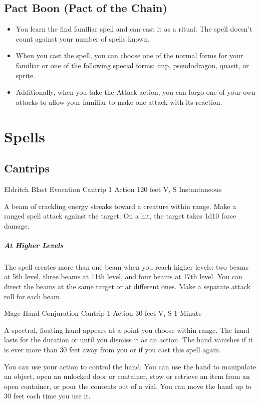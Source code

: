 {\subsection*{Pact Boon (Pact of the Chain)}
\begin{itemize}
	\item You learn the find familiar spell and can cast it as a ritual. The spell doesn't count against your number of spells known.
	\item When you cast the spell, you can choose one of the normal forms for your familiar or one of the following special forms: imp, pseudodragon, quasit, or sprite.
	\item Additionally, when you take the Attack action, you can forgo one of your own attacks to allow your familiar to make one attack with its reaction.
\end{itemize}
\vfill\eject
\section*{Spells}
\subsection*{Cantrips}

\DndSpellHeader
	{Eldritch Blast}
	{Evocation Cantrip}
	{1 Action}
	{120 feet}
	{V, S}
	{Instantaneous}

A beam of crackling energy streaks toward a creature within range. Make a ranged spell attack against the target. On a hit, the target takes 1d10 force damage.

\subparagraph*{At Higher Levels} The spell creates more than one beam when you reach higher levels: two beams at 5th level, three beams at 11th level, and four beams at 17th level. You can direct the beams at the same target or at different ones. Make a separate attack roll for each beam.

\DndSpellHeader
	{Mage Hand}
	{Conjuration Cantrip}
	{1 Action}
	{30 feet}
	{V, S}
	{1 Minute}

A spectral, floating hand appears at a point you choose within range. The hand lasts for the duration or until you dismiss it as an action. The hand vanishes if it is ever more than 30 feet away from you or if you cast this spell again.

You can use your action to control the hand. You can use the hand to manipulate an object, open an unlocked door or container, stow or retrieve an item from an open container, or pour the contents out of a vial. You can move the hand up to 30 feet each time you use it.

}
